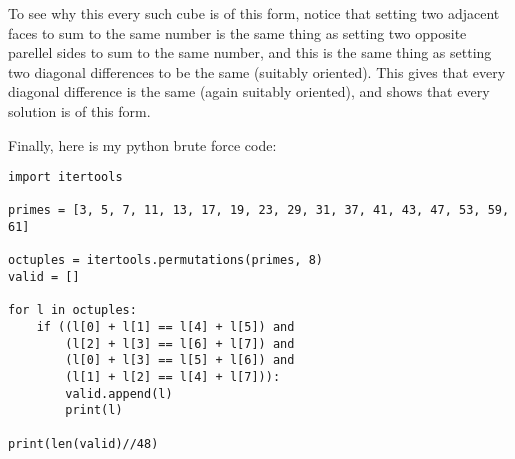 \documentclass[11pt]{article}
\theoremstyle{definition}
\begin{document}
To see why this every such cube is of this form, notice that setting two adjacent faces to sum to the same number is the same thing as setting two opposite parellel sides to sum to the same number, and this is the same thing as setting two diagonal differences to be the same (suitably oriented).  This gives that every diagonal difference is the same (again suitably oriented), and shows that every solution is of this form.

Finally, here is my python brute force code:
\begin{verbatim}
import itertools

primes = [3, 5, 7, 11, 13, 17, 19, 23, 29, 31, 37, 41, 43, 47, 53, 59, 61]

octuples = itertools.permutations(primes, 8)
valid = []

for l in octuples:
    if ((l[0] + l[1] == l[4] + l[5]) and
        (l[2] + l[3] == l[6] + l[7]) and
        (l[0] + l[3] == l[5] + l[6]) and
        (l[1] + l[2] == l[4] + l[7])):
        valid.append(l)
        print(l)

print(len(valid)//48)
\end{verbatim}
\end{document}
